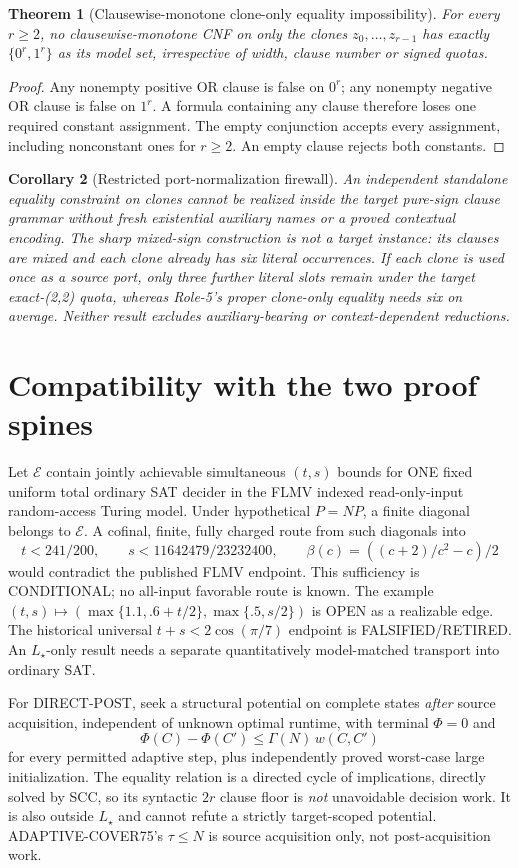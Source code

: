 \documentclass[11pt]{article}
\newtheorem{theorem}{Theorem}
\newtheorem{corollary}[theorem]{Corollary}
\begin{document}
\begin{theorem}[Clausewise-monotone clone-only equality impossibility]
For every $r\ge2$, no clausewise-monotone CNF on only the clones $z_0,\ldots,z_{r-1}$ has exactly $\{0^r,1^r\}$ as its model set, irrespective of width, clause number or signed quotas.
\end{theorem}
\begin{proof}
Any nonempty positive OR clause is false on $0^r$; any nonempty negative OR clause is false on $1^r$. A formula containing any clause therefore loses one required constant assignment. The empty conjunction accepts every assignment, including nonconstant ones for $r\ge2$. An empty clause rejects both constants.
\end{proof}
\begin{corollary}[Restricted port-normalization firewall]
An independent standalone equality constraint on clones cannot be realized inside the target pure-sign clause grammar without fresh existential auxiliary names or a proved contextual encoding. The sharp mixed-sign construction is \emph{not} a target instance: its clauses are mixed and each clone already has six literal occurrences. If each clone is used once as a source port, only three further literal slots remain under the target exact-(2,2) quota, whereas Role-5's proper clone-only equality needs six on average. Neither result excludes auxiliary-bearing or context-dependent reductions.
\end{corollary}

\section{Compatibility with the two proof spines}
Let $\mathcal E$ contain jointly achievable simultaneous $(t,s)$ bounds for ONE fixed uniform total ordinary SAT decider in the FLMV indexed read-only-input random-access Turing model. Under hypothetical $P=NP$, a finite diagonal belongs to $\mathcal E$. A cofinal, finite, fully charged route from such diagonals into
\[
t<241/200,\qquad s<11642479/23232400,\qquad
\beta(c)=((c+2)/c^2-c)/2
\tag{3}
\]
would contradict the published FLMV endpoint. This sufficiency is CONDITIONAL; no all-input favorable route is known. The example $(t,s)\mapsto(\max\{1.1,.6+t/2\},\max\{.5,s/2\})$ is OPEN as a realizable edge. The historical universal $t+s<2\cos(\pi/7)$ endpoint is FALSIFIED/RETIRED. An $L_\star$-only result needs a separate quantitatively model-matched transport into ordinary SAT.

For DIRECT-POST, seek a structural potential on complete states \emph{after} source acquisition, independent of unknown optimal runtime, with terminal $\Phi=0$ and
\[
\Phi(C)-\Phi(C')\le \Gamma(N)\,w(C,C')
\tag{4}
\]
for every permitted adaptive step, plus independently proved worst-case large initialization. The equality relation is a directed cycle of implications, directly solved by SCC, so its syntactic $2r$ clause floor is \emph{not} unavoidable decision work. It is also outside $L_\star$ and cannot refute a strictly target-scoped potential. ADAPTIVE-COVER75's $\tau\le N$ is source acquisition only, not post-acquisition work.
\end{document}
